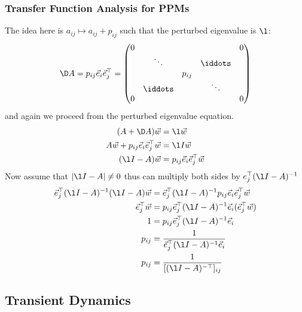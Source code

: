 \subsubsection{Transfer Function Analysis for PPMs}
The idea here is $a_{ij} \mapsto a_{ij} + p_{ij}$ such that the perturbed eigenvalue is $\l$:
$$ \D A = p_{ij}\vec e_i\vec e_j^\top = \begin{pmatrix}
  0 &&&& 0 \\
  & \ddots &&\iddots& \\
  &&p_{ij}&&\\
  & \iddots &&\ddots&\\
  0 &&&& 0
\end{pmatrix}  $$
and again we proceed from the perturbed eigenvalue equation.
\begin{align*}
  (A + \D A)\vec w &= \l \vec w \\
  A\vec w + p_{ij}\vec e_i\vec e_j^\top \vec w &= \l I\vec w \\
  (\l I - A)\vec w &= p_{ij}\vec e_i\vec e_j^\top \vec w
\end{align*}
Now assume that $|\l I - A|\ne 0$ thus can multiply both sides by $e_j^\top (\l I - A)^{-1}$
\begin{align*}
  \vec e_j^\top (\l I - A)^{-1} (\l I - A)\vec w &= \vec e_j^\top (\l I - A)^{-1}p_{ij}\vec e_i\vec e_j^\top \vec w \\
  \vec e_j^\top \vec w &= p_{ij} \vec e_j^\top (\l I - A)^{-1} \vec e_i (\vec e_j^\top \vec w) \\
  1 &= p_{ij} \vec e_j^\top (\l I - A)^{-1} \vec e_i \\
  p_{ij} &= \frac{1}{\vec e_j^\top (\l I - A)^{-1} \vec e_i} \\
  p_{ij} &= \frac{1}{[(\l I - A)^{-\top}]_{ij}}
\end{align*}

\subsection{Transient Dynamics}

